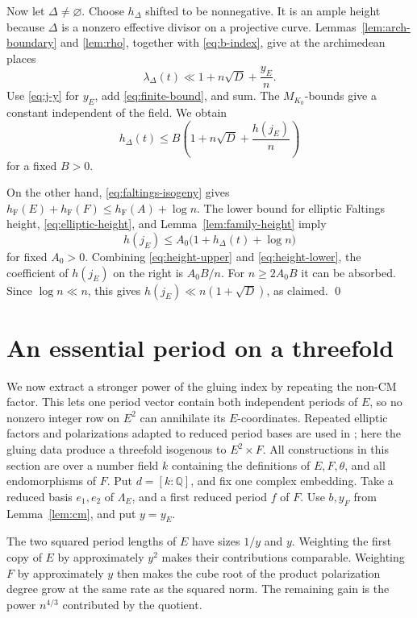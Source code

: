 \documentclass[11pt,a4paper]{article}
\numberwithin{equation}{section}
\theoremstyle{definition}
\theoremstyle{remark}
\newcommand{\Q}{\mathbb Q}
\newcommand{\hF}{h_{\mathrm F}}
\begin{document}
Now let \(\Delta\ne\varnothing\). Choose \(h_\Delta\) shifted to be
nonnegative. It is an ample height because \(\Delta\) is a nonzero
effective divisor on a projective curve.
Lemmas~\ref{lem:arch-boundary} and \ref{lem:rho}, together with
\eqref{eq:b-index}, give at the archimedean places
\[
 \lambda_\Delta(t)\ll
 1+n\sqrt D+\frac{y_E}{n}.
\]
Use \eqref{eq:j-y} for \(y_E\), add \eqref{eq:finite-bound}, and sum.
The \(M_{K_0}\)-bounds give a constant independent of the field.
We obtain
\begin{equation}\label{eq:height-upper}
 h_\Delta(t)\le B\left(1+n\sqrt D+\frac{h(j_E)}n\right)
\end{equation}
for a fixed \(B>0\).

On the other hand, \eqref{eq:faltings-isogeny} gives
\(\hF(E)+\hF(F)\le\hF(A)+\log n\).
The lower bound for elliptic Faltings height,
\eqref{eq:elliptic-height}, and Lemma~\ref{lem:family-height} imply
\begin{equation}\label{eq:height-lower}
 h(j_E)\le A_0\bigl(1+h_\Delta(t)+\log n\bigr)
\end{equation}
for fixed \(A_0>0\). Combining \eqref{eq:height-upper} and
\eqref{eq:height-lower}, the coefficient of \(h(j_E)\) on the
right is \(A_0B/n\).
For \(n\ge2A_0B\) it can be absorbed.
Since \(\log n\ll n\), this gives
\(h(j_E)\ll n(1+\sqrt D)\), as claimed.
\qed

\section{An essential period on a threefold}\label{sec:threefold}

We now extract a stronger power of the gluing index by repeating the
non-CM factor. This lets one period vector contain both independent
periods of \(E\), so no nonzero integer row on \(E^2\) can annihilate
its \(E\)-coordinates. Repeated elliptic factors and polarizations
adapted to reduced period bases are used in
\cite[\S\S7.2--7.3]{GR}; here the gluing data produce a threefold
isogenous to \(E^2\times F\).
All constructions in this section are over a number
field \(k\) containing the definitions of \(E,F,\theta\), and all
endomorphisms of \(F\). Put \(d=[k:\Q]\), and fix one complex
embedding. Take a reduced basis \(e_1,e_2\) of \(\Lambda_E\), and
a first reduced period \(f\) of \(F\). Use \(b,y_F\) from
Lemma~\ref{lem:cm}, and put \(y=y_E\).

The two squared period lengths of \(E\) have sizes \(1/y\) and
\(y\). Weighting the first copy of \(E\) by approximately \(y^2\)
makes their contributions comparable. Weighting \(F\) by approximately
\(y\) then makes the cube root of the product polarization degree
grow at the same rate as the squared norm. The remaining gain is
the power \(n^{4/3}\) contributed by the quotient.
\end{document}
